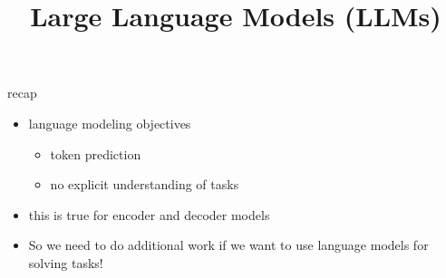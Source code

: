 



\newcommand{\learninggoals}{
\item comprehend the different subtleties in the space of fine-tuning and prompting}

\def\myblue#1{\textcolor{texblue}{#1}}

\title{Large Language Models (LLMs)}
\date{}




\begin{frame}{recap}

\vfill

\begin{itemize}
    \item language modeling objectives
        \begin{itemize}
            \item token prediction
            \item no explicit understanding of tasks
        \end{itemize}
    \item this is true for encoder and decoder models
    \item So we need to do additional work if we want
        to use language models for solving tasks!
\end{itemize}

\vfill

\end{frame}


